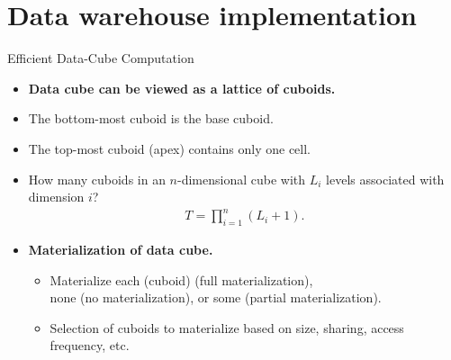 \section{Data warehouse implementation}

\begin{frame}{Efficient Data-Cube Computation}
  \begin{itemize}
  \item \textbf{Data cube can be viewed as a lattice of cuboids.}
  \item The bottom-most cuboid is the base cuboid.
  \item The top-most cuboid (apex) contains only one cell.
  \item How many cuboids in an $n$-dimensional cube with $L_i$ levels associated with dimension $i$?
    \begin{align}
      T = \prod_{i=1}^{n} (L_i +1).
    \end{align}
  \item \textbf{{\color{airforceblue}Materialization} of data cube.}
    \begin{itemize}
    \item Materialize each (cuboid) (full materialization), \\
      none (no materialization), or some (partial materialization).
    \item Selection of cuboids to materialize based on size, sharing, access frequency, etc.
    \end{itemize}
  \end{itemize}
\end{frame}

